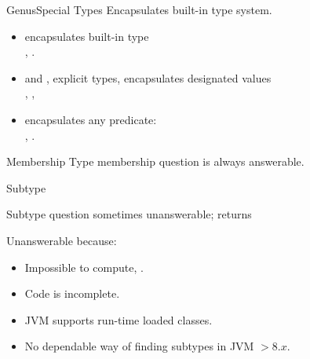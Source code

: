 \begin{frame}{Genus}{Special Types}
  Encapsulates built-in type system.

  \bigskip
  
  \begin{itemize}
  \item {} encapsulates built-in type \\
    \eg, .
  \item {} and , explicit types, encapsulates designated values\\
    \eg, , 
  \item {} encapsulates any predicate: \\
    \eg, .
  \end{itemize}
\end{frame}


\newsavebox\membershipbox
\begin{lrbox}{\membershipbox}
  \begin{minipage}{11cm}
    
  \end{minipage}
\end{lrbox}

\begin{frame}{Membership}
  Type membership question is always answerable.

  \usebox\membershipbox
\end{frame}

\newsavebox\subtypebox
\begin{lrbox}{\subtypebox}
  \begin{minipage}{11cm}

  \end{minipage}
\end{lrbox}



\begin{frame}{Subtype}

  Subtype question sometimes unanswerable;  returns 

  \usebox\subtypebox

  Unanswerable because:
  \begin{itemize}
  \item Impossible to compute, \eg {}.
  \item Code is incomplete.
  \item JVM supports run-time loaded classes.
  \item No dependable way of finding subtypes in JVM $> 8.x$.
  \end{itemize}

\end{frame}
